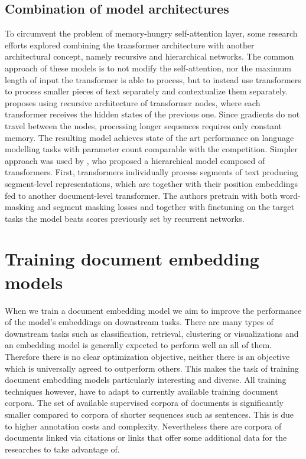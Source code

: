 \subsection{Combination of model architectures}

To circumvent the problem of memory-hungry self-attention layer, some research
efforts explored combining the transformer architecture with another
architectural concept, namely recursive and hierarchical networks. The common
approach of these models is to not modify the self-attention, nor the maximum
length of input the transformer is able to process, but to instead use
transformers to process smaller pieces of text separately and contextualize
them separately. \cite{dai2019transformer} proposes using recursive
architecture of transformer nodes, where each transformer receives the hidden
states of the previous one. Since gradients do not travel between the nodes,
processing longer sequences requires only constant memory. The resulting model
achieves state of the art performance on language modelling tasks with parameter count
comparable with the competition. Simpler approach was used by
\cite{yang2020beyond}, who proposed a hierarchical model composed of
transformers. First, transformers individually process segments of text
producing segment-level representations, which are together with their position
embeddings fed to another document-level transformer. The authors pretrain with
both word-masking and segment masking losses and together with finetuning on
the target tasks the model beats scores previously set by recurrent networks.


\section{Training document embedding models}





When we train a document embedding model we aim to improve the performance of
the model's embeddings on downstream tasks. There are many types of downstream
tasks such as classification, retrieval, clustering or visualizations and an
embedding model is generally expected to perform well an all of them. Therefore
there is no clear optimization objective, neither there is an objective which
is universally agreed to outperform others. This makes the task of training
document embedding models particularly interesting and diverse. All training
techniques however, have to adapt to currently available training document
corpora. The set of available supervised corpora of documents is significantly
smaller compared to corpora of shorter sequences such as sentences. This is due
to higher annotation costs and complexity. Nevertheless there are corpora of
documents linked via citations or links that offer some additional data for the
researches to take advantage of.

